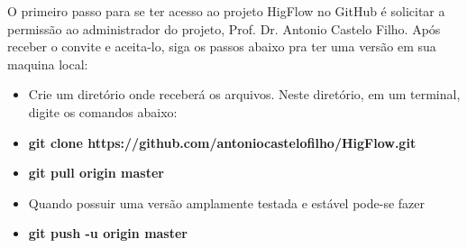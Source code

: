 \documentclass[12pt]{article}
\begin{document}
O primeiro passo para se ter acesso ao projeto HigFlow no GitHub é solicitar a permissão ao administrador do projeto, Prof. Dr. Antonio Castelo Filho. Após receber o convite e aceita-lo, siga os passos abaixo pra ter uma versão em sua maquina local:

\begin{itemize}
	\item Crie um diretório onde receberá os arquivos. Neste diretório, em um terminal, digite os comandos abaixo:
	
	\item \textbf{git clone https://github.com/antoniocastelofilho/HigFlow.git}
	
	\item \textbf{git pull origin master}
	
	\item Quando possuir uma versão amplamente testada e estável pode-se fazer 
	
	\item \textbf{git push -u origin master}
	
\end{itemize}

%
%
\end{document}
